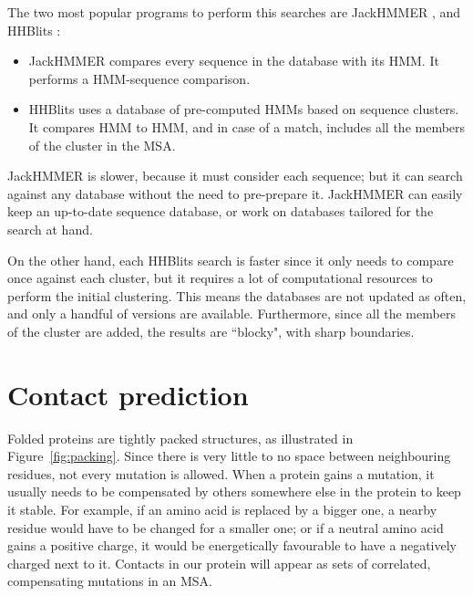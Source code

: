 The two most popular programs to perform this searches are JackHMMER \citep{jh}, and HHBlits \citep{hhblits}:

\begin{itemize}
\item JackHMMER compares every sequence in the database with its HMM.
It performs a HMM-sequence comparison.
\item HHBlits uses a database of pre-computed HMMs based on sequence clusters.
It compares HMM to HMM, and in case of a match, includes all the members of the cluster in the MSA.
\end{itemize}

JackHMMER is slower, 
because it must consider each sequence; but it can search against any database without the need to pre-prepare it.
JackHMMER can easily keep an up-to-date sequence database, or work on databases tailored for the search at hand.

On the other hand, each HHBlits search is faster since it only needs to compare once against each cluster, but it requires a lot of computational resources to perform the initial clustering.
This means the databases are not updated as often, and only a handful of versions are available.
Furthermore, since all the members of the cluster are added, the results are ``blocky",
with sharp boundaries.




\section{Contact prediction}
Folded proteins are tightly packed structures, as illustrated in Figure~\ref{fig:packing}.
Since there is very little to no space between neighbouring residues, not every mutation is allowed.
When a protein gains a mutation, it usually needs to be compensated by others somewhere else in the protein to keep it stable.
For example, if an amino acid is replaced by a bigger one, a nearby residue would have to be changed for a smaller one; or if a neutral amino acid gains a positive charge, it would be energetically favourable to have a negatively charged next to it.
Contacts in our protein will appear as sets of correlated, compensating mutations in an MSA.

